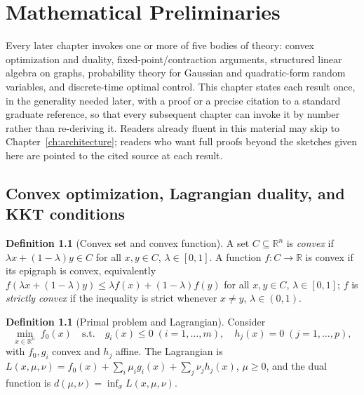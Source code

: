 \documentclass[11pt]{report}
\theoremstyle{plain}
\theoremstyle{definition}
\newtheorem{definition}[theorem]{Definition}
\theoremstyle{remark}
\begin{document}
\chapter{Mathematical Preliminaries}
\label{ch:prelim}

Every later chapter invokes one or more of five bodies of theory:
convex optimization and duality, fixed-point/contraction arguments,
structured linear algebra on graphs, probability theory for Gaussian
and quadratic-form random variables, and discrete-time optimal control.
This chapter states each result once, in the generality needed later,
with a proof or a precise citation to a standard graduate reference, so
that every subsequent chapter can invoke it by number rather than
re-deriving it. Readers already fluent in this material may skip to
Chapter~\ref{ch:architecture}; readers who want full proofs beyond the
sketches given here are pointed to the cited source at each result.

\section{Convex optimization, Lagrangian duality, and KKT conditions}
\label{sec:convex-prelim}

\begin{definition}[Convex set and convex function]
A set $C\subseteq\mathbb{R}^n$ is \emph{convex} if
$\lambda x+(1-\lambda)y\in C$ for all $x,y\in C$, $\lambda\in[0,1]$. A
function $f:C\to\mathbb{R}$ is convex if its epigraph is convex,
equivalently $f(\lambda x+(1-\lambda)y)\le \lambda f(x)+(1-\lambda)f(y)$
for all $x,y\in C$, $\lambda\in[0,1]$; $f$ is \emph{strictly convex} if
the inequality is strict whenever $x\ne y$, $\lambda\in(0,1)$.
\end{definition}

\begin{definition}[Primal problem and Lagrangian]
\label{def:primal}
Consider
\begin{equation}
\min_{x\in\mathbb{R}^n}\; f_0(x) \quad\text{s.t.}\quad g_i(x)\le0 \;(i=1,\ldots,m), \quad h_j(x)=0 \;(j=1,\ldots,p),
\label{eq:primal}
\end{equation}
with $f_0,g_i$ convex and $h_j$ affine. The Lagrangian is
$L(x,\mu,\nu)=f_0(x)+\sum_i\mu_ig_i(x)+\sum_j\nu_jh_j(x)$, $\mu\ge0$, and
the dual function is $d(\mu,\nu)=\inf_x L(x,\mu,\nu)$.
\end{definition}
\end{document}
